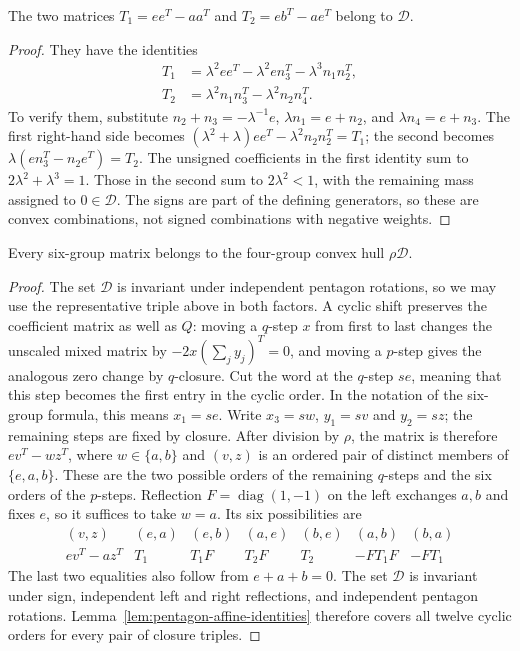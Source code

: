 \begin{lemma}\label{lem:pentagon-affine-identities}
The two matrices $T_1=ee^T-aa^T$ and $T_2=eb^T-ae^T$ belong to $\mathcal D$.
\end{lemma}
\begin{proof}
They have the identities
\begin{align*}
 T_1&=\lambda^2ee^T-\lambda^2en_3^T-\lambda^3n_1n_2^T,\\
 T_2&=\lambda^2n_1n_3^T-\lambda^2n_2n_4^T.
\end{align*}
To verify them, substitute
$n_2+n_3=-\lambda^{-1}e$,
$\lambda n_1=e+n_2$, and $\lambda n_4=e+n_3$.
The first right-hand side becomes
$(\lambda^2+\lambda)ee^T-\lambda^2n_2n_2^T=T_1$;
the second becomes $\lambda(en_3^T-n_2e^T)=T_2$.
The unsigned coefficients in the first identity sum to
$2\lambda^2+\lambda^3=1$. Those in the second sum to
$2\lambda^2<1$, with the remaining mass assigned to $0\in\mathcal D$.
The signs are part of the defining generators, so these are convex
combinations, not signed combinations with negative weights.
\end{proof}

\begin{lemma}\label{lem:pentagon-affine-containment}
Every six-group matrix belongs to the four-group convex hull $\rho\mathcal D$.
\end{lemma}
\begin{proof}
The set $\mathcal D$ is invariant under independent pentagon rotations,
so we may use the representative triple above in both factors.
A cyclic shift preserves the coefficient matrix as well as $Q$: moving
a $q$-step $x$ from first to last changes the unscaled mixed matrix by
$-2x(\sum_j y_j)^T=0$, and moving a $p$-step gives the analogous zero
change by $q$-closure. Cut the word at the $q$-step $se$, meaning that
this step becomes the first entry in the cyclic order.
In the notation of the six-group formula, this means
$x_1=se$. Write $x_3=sw$, $y_1=sv$ and $y_2=sz$; the remaining steps are
fixed by closure. After division by $\rho$, the matrix is therefore
$ev^T-wz^T$, where $w\in\{a,b\}$ and $(v,z)$ is an ordered pair of
distinct members of $\{e,a,b\}$. These are the two possible orders of the
remaining $q$-steps and the six orders of the $p$-steps.
Reflection $F=\operatorname{diag}(1,-1)$ on the left exchanges
$a,b$ and fixes $e$, so it suffices to take $w=a$. Its six possibilities are
\[
\begin{array}{c|cccccc}
(v,z)&(e,a)&(e,b)&(a,e)&(b,e)&(a,b)&(b,a)\\\hline
 ev^T-az^T&T_1&T_1F&T_2F&T_2&-FT_1F&-FT_1
\end{array}
\]
The last two equalities also follow from $e+a+b=0$. The set $\mathcal D$ is
invariant under sign, independent left and right reflections, and independent
pentagon rotations. Lemma~\ref{lem:pentagon-affine-identities} therefore
covers all twelve cyclic orders for every pair of closure triples.
\end{proof}

